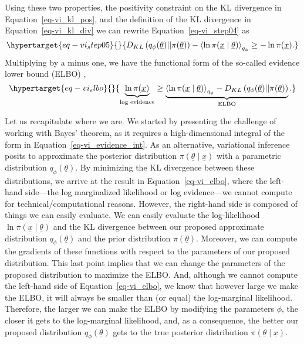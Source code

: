 \documentclass[
  letterpaper,
  DIV=11,
  numbers=noendperiod]{scrartcl}
\begin{document}
\begin{refsegment}
Using these two properties, the positivity constraint on the KL
divergence in Equation~\ref{eq-vi_kl_pos}, and the definition of the KL
divergence in Equation~\ref{eq-vi_kl_div} we can rewrite
Equation~\ref{eq-vi_step04} as
\begin{equation}\protect\hypertarget{eq-vi_step05}{}{
D_{KL}\left( 
    q_\phi(\underline{\theta}) \vert \vert
    \pi(\underline{\theta}) 
\right) -
\left\langle
    \ln \pi(\underline{x} \mid \underline{\theta})
\right\rangle_{q_\phi}
\geq - \ln \pi(\underline{x}).
}\label{eq-vi_step05}\end{equation} Multiplying by a minus one, we have
the functional form of the so-called evidence lower bound (ELBO)
\textcite{kingma2014},
\begin{equation}\protect\hypertarget{eq-vi_elbo}{}{
\underbrace{
    \ln \pi(\underline{x})
}_{\text{log evidence}} \geq
\underbrace{
    \left\langle
        \ln \pi(\underline{x} \mid \underline{\theta})
    \right\rangle_{q_\phi} -
    D_{KL}\left( 
        q_\phi(\underline{\theta}) \vert \vert
        \pi(\underline{\theta}) 
    \right)
}_{\text{ELBO}}.
}\label{eq-vi_elbo}\end{equation}

Let us recapitulate where we are. We started by presenting the challenge
of working with Bayes' theorem, as it requires a high-dimensional
integral of the form in Equation~\ref{eq-vi_evidence_int}. As an
alternative, variational inference posits to approximate the posterior
distribution \(\pi(\underline{\theta} \mid \underline{x})\) with a
parametric distribution \(q_\phi(\underline{\theta})\). By minimizing
the KL divergence between these distributions, we arrive at the result
in Equation~\ref{eq-vi_elbo}, where the left-hand side---the log
marginalized likelihood or log evidence---we cannot compute for
technical/computational reasons. However, the right-hand side is
composed of things we can easily evaluate. We can easily evaluate the
log-likelihood \(\ln \pi(\underline{x} \mid \underline{\theta})\) and
the KL divergence between our proposed approximate distribution
\(q_\phi(\underline{\theta})\) and the prior distribution
\(\pi(\underline{\theta})\). Moreover, we can compute the gradients of
these functions with respect to the parameters of our proposed
distribution. This last point implies that we can change the parameters
of the proposed distribution to maximize the ELBO. And, although we
cannot compute the left-hand side of Equation~\ref{eq-vi_elbo}, we know
that however large we make the ELBO, it will always be smaller than (or
equal) the log-marginal likelihood. Therefore, the larger we can make
the ELBO by modifying the parameters \(\phi\), the closer it gets to the
log-marginal likelihood, and, as a consequence, the better our proposed
distribution \(q_\phi(\underline{\theta})\) gets to the true posterior
distribution \(\pi(\underline{\theta} \mid \underline{x})\).


\end{refsegment}
\end{document}
